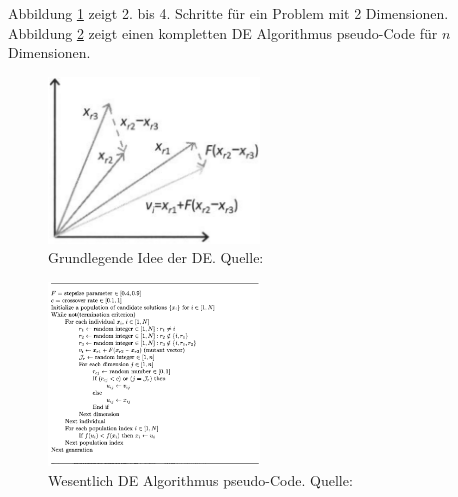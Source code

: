 \documentclass[twoside,twocolumn]{article}
\begin{document}
Abbildung \ref{fig:de_beispiel} zeigt 2. bis 4. Schritte für ein Problem mit 2 Dimensionen. Abbildung \ref{fig:de_pseudo} zeigt einen kompletten DE Algorithmus pseudo-Code für $n$ Dimensionen.\par

\begin{figure}
\caption{Grundlegende Idee der DE. Quelle: \cite[p.~294]{wiley_evolutionary}}
\label{fig:de_beispiel}
\centering
\includegraphics[width=0.5\textwidth]{images/de_beispiel.png}
\end{figure}

\begin{figure}
\caption{Wesentlich DE Algorithmus pseudo-Code. Quelle: \cite[p.~295]{wiley_evolutionary}}
\label{fig:de_pseudo}
\centering
\includegraphics[width=0.5\textwidth]{images/de_pseudo.png}
\end{figure}
\end{document}

